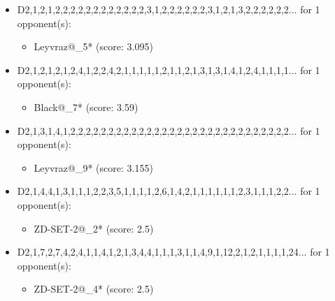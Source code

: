 \begin{appendices}
\begin{itemize}
    \item D2,1,2,1,2,2,2,2,2,2,2,2,2,2,2,2,3,1,2,2,2,2,2,2,3,1,2,1,3,2,2,2,2,2,2... for 1 opponent(s):
    \begin{multicols}{3}
         \begin{itemize}
            \item Leyvraz@\_5* (score: 3.095)
        \end{itemize}
     \end{multicols}
     
    \item D2,1,2,1,2,1,2,4,1,2,2,4,2,1,1,1,1,1,2,1,1,2,1,3,1,3,1,4,1,2,4,1,1,1,1... for 1 opponent(s):
    \begin{multicols}{3}
         \begin{itemize}
            \item Black@\_7* (score: 3.59)
        \end{itemize}
     \end{multicols}
     
    \item D2,1,3,1,4,1,2,2,2,2,2,2,2,2,2,2,2,2,2,2,2,2,2,2,2,2,2,2,2,2,2,2,2,2,2... for 1 opponent(s):
    \begin{multicols}{3}
         \begin{itemize}
            \item Leyvraz@\_9* (score: 3.155)
        \end{itemize}
     \end{multicols}
     
    \item D2,1,4,4,1,3,1,1,1,2,2,3,5,1,1,1,1,2,6,1,4,2,1,1,1,1,1,1,2,3,1,1,1,2,2... for 1 opponent(s):
    \begin{multicols}{3}
         \begin{itemize}
            \item ZD-SET-2@\_2* (score: 2.5)
        \end{itemize}
     \end{multicols}
     
    \item D2,1,7,2,7,4,2,4,1,1,4,1,2,1,3,4,4,1,1,1,3,1,1,4,9,1,12,2,1,2,1,1,1,1,24... for 1 opponent(s):
    \begin{multicols}{3}
         \begin{itemize}
            \item ZD-SET-2@\_4* (score: 2.5)
        \end{itemize}
     \end{multicols}
     

\end{itemize}
\end{appendices}
